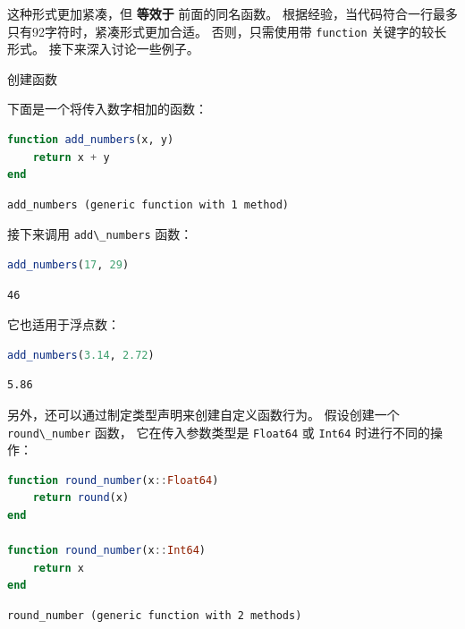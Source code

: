 \documentclass[
  notoc %
]{tufte-book}
\makeatletter
\newcommand{\passthrough}[1]{#1}
\renewcommand\subsubsection{%
\@startsection{subsubsection}{3}{\z@ }{-3.25ex\@plus -1ex \@minus -.2ex}{1.5ex \@plus .2ex}{\normalfont \normalsize \bfseries }
}
\makeatother
\begin{document}
这种形式更加紧凑，但 \textbf{等效于} 前面的同名函数。
根据经验，当代码符合一行最多只有92字符时，紧凑形式更加合适。
否则，只需使用带 \passthrough{\lstinline!function!} 关键字的较长形式。
接下来深入讨论一些例子。

\hypertarget{sec:function_example}{%
\subsubsection{创建函数}\label{sec:function_example}}

下面是一个将传入数字相加的函数：

\begin{lstlisting}[language=Julia]
function add_numbers(x, y)
    return x + y
end
\end{lstlisting}

\begin{lstlisting}[language=Output]
add_numbers (generic function with 1 method)
\end{lstlisting}

接下来调用 \passthrough{\lstinline!add\_numbers!} 函数：

\begin{lstlisting}[language=Julia]
add_numbers(17, 29)
\end{lstlisting}

\begin{lstlisting}[language=Output]
46
\end{lstlisting}

它也适用于浮点数：

\begin{lstlisting}[language=Julia]
add_numbers(3.14, 2.72)
\end{lstlisting}

\begin{lstlisting}[language=Output]
5.86
\end{lstlisting}

另外，还可以通过制定类型声明来创建自定义函数行为。 假设创建一个
\passthrough{\lstinline!round\_number!} 函数， 它在传入参数类型是
\passthrough{\lstinline!Float64!} 或 \passthrough{\lstinline!Int64!}
时进行不同的操作：

\begin{lstlisting}[language=Julia]
function round_number(x::Float64)
    return round(x)
end

function round_number(x::Int64)
    return x
end
\end{lstlisting}

\begin{lstlisting}[language=Output]
round_number (generic function with 2 methods)
\end{lstlisting}
\end{document}
